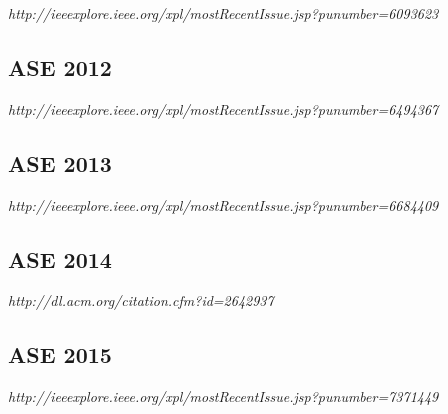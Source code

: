 {\small \em http://ieeexplore.ieee.org/xpl/mostRecentIssue.jsp?punumber=6093623}

\subsection{ASE 2012}

{\small \em http://ieeexplore.ieee.org/xpl/mostRecentIssue.jsp?punumber=6494367}

\subsection{ASE 2013}

{\small \em http://ieeexplore.ieee.org/xpl/mostRecentIssue.jsp?punumber=6684409}

\subsection{ASE 2014}

{\small \em http://dl.acm.org/citation.cfm?id=2642937}

\subsection{ASE 2015}

{\small \em http://ieeexplore.ieee.org/xpl/mostRecentIssue.jsp?punumber=7371449}

